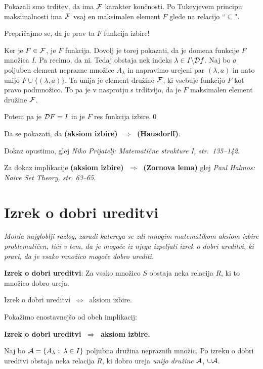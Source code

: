 \documentclass[11pt,paper=b5,footinclude,headinclude]{scrbook} %
\def\sledi {{~\Rightarrow~}}
\def\cee {{~\Leftrightarrow~}}
\begin{document}
Pokazali smo trditev, da ima ${\cal F}$ karakter končnosti.
Po Tukeyjevem principu maksimalnosti ima ${\cal F}$ vsaj en maksimalen element $F$ glede na relacijo ``$\subseteq$".

Prepričajmo se, da je prav ta $F$ funkcija izbire!

Ker je $F\in{\cal F}$, je $F$ funkcija. Dovolj je torej pokazati, da je domena funkcije $F$ množica $I$. Pa recimo, da ni. Tedaj obstaja nek indeks $\lambda\in I\backslash {\cal D}f$. Naj bo $a$ poljuben element neprazne množice $A_\lambda$ in napravimo urejeni par $(\lambda, a)$ in nato unijo $F\cup\{(\lambda,a)\}$. Ta unija je element družine ${\cal F}$, ki vsebuje funkcijo $F$ kot pravo podmnožico. To pa je v nasprotju s trditvijo, da je $F$ maksimalen element družine ${\cal F}$.

Potem pa je ${\cal D}F = I$ in je $F$ res funkcija izbire.\qed

\bigskip

Da se pokazati, da \textbf{(aksiom izbire) $\sledi$ (Hausdorff)}.

Dokaz opustimo, glej \emph{ Niko Prijatelj: Matemati\v cne strukture I, str.~135--142}.

Za dokaz implikacije \textbf{(aksiom izbire) $\sledi$ (Zornova lema)}
glej \emph{ Paul Halmos: Naive Set Theory, str. 63--65}.

\section{Izrek o dobri ureditvi}

\emph{ Morda najgloblji razlog, zaradi katerega se zdi mnogim matematikom aksiom izbire problematičen,
tiči v tem, da je mogoče iz njega izpeljati izrek o dobri ureditvi, ki pravi, da je vsako
množico mogoče dobro urediti.}


\medskip
\textbf{Izrek o dobri ureditvi}: Za vsako množico $S$ obstaja neka relacija $R$, ki to množico dobro ureja.

\bigskip
Izrek o dobri ureditvi $\cee$ aksiom izbire.

\bigskip
Pokažimo enostavnejšo  od obeh implikacij:

\textbf{Izrek o dobri ureditvi $\sledi$ aksiom izbire.}

Naj bo ${\cal A} = \{A_\lambda~;~\lambda\in I\}$ poljubna družina nepraznih množic.
Po izreku o dobri ureditvi obstaja neka relacija $R$, ki dobro ureja \emph{ unijo družine ${\cal A}$}, $\cup {\cal A}$.
\end{document}
